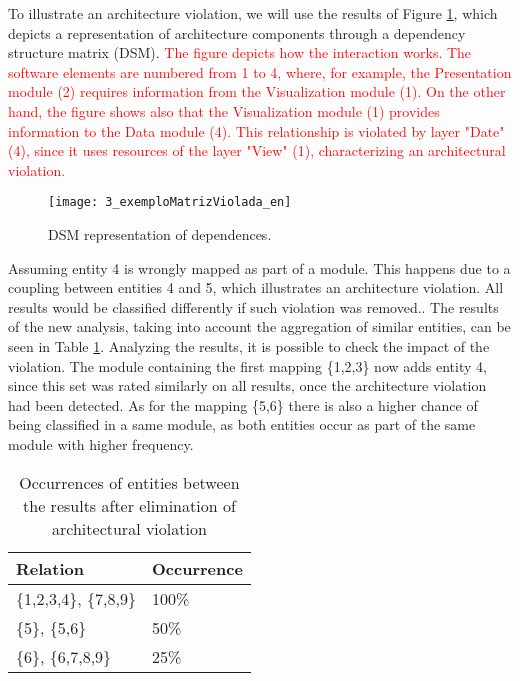 To illustrate an architecture violation, we will use the results of Figure \ref{3_exemploMatrizViolada}, which depicts a representation of architecture components through a dependency structure matrix (DSM). \textcolor{red}{The figure depicts how the interaction works. The software elements are numbered from 1 to 4, where, for example, the Presentation module (2) requires information from the Visualization module (1). On the other hand, the figure shows also that the Visualization module (1) provides information to the Data module (4). This relationship is violated by layer "Date" (4), since it uses resources of the layer  "View" (1), characterizing an architectural violation. }

 \begin{figure}[!h]
 	\centering
 	\texttt{[image: 3\_exemploMatrizViolada\_en]}
 	\caption{DSM representation	of dependences.}
 	\label{3_exemploMatrizViolada}
 \end{figure}
 
 Assuming entity 4 is wrongly mapped as part of a module. This happens due to a coupling between entities 4 and 5, which illustrates an architecture violation. All results would be classified differently if such violation was removed.. The results of the new analysis, taking into account the aggregation of similar entities, can be seen in Table \ref{ocorrencias_2}. Analyzing the results, it is possible to check the impact of the violation. The module containing the first mapping \{1,2,3\} now adds entity 4, since this set was rated similarly on all results, once the architecture violation had been detected. As for the mapping \{5,6\} there is also a higher chance of being classified in a same module, as both entities occur as part of the same module with higher frequency.


\begin{table}[]
	\centering
	\caption{Occurrences of entities between the results after elimination of architectural violation}
	\label{ocorrencias_2}
	\begin{tabular}{|ll|}
		\hline
		\multicolumn{1}{|l}{Relation} & \multicolumn{1}{l|}{Occurrence} \\ \hline
		\{1,2,3,4\}, \{7,8,9\}  	 & 100\%                           \\ \hline
		\{5\}, \{5,6\}	& 50\%                            \\ \hline
		\{6\}, \{6,7,8,9\}	& 25\%                            \\ 
		\hline
	\end{tabular}
\end{table}

